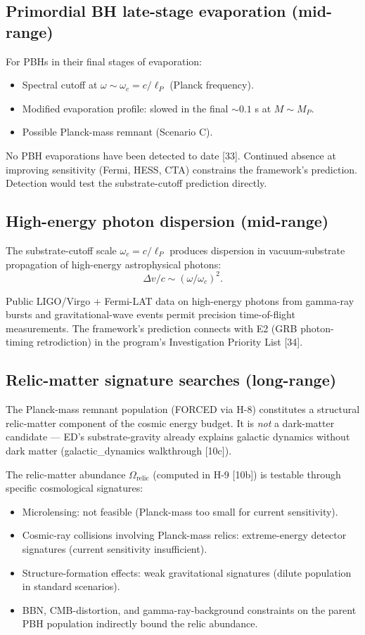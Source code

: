 \documentclass[11pt,a4paper]{article}
\begin{document}
\subsection{Primordial BH late-stage evaporation (mid-range)}

For PBHs in their final stages of evaporation:
\begin{itemize}[noitemsep]
  \item Spectral cutoff at $\omega \sim \omega_c = c/\ell_P$ (Planck frequency).
  \item Modified evaporation profile: slowed in the final $\sim 0.1$ s at $M \sim M_P$.
  \item Possible Planck-mass remnant (Scenario C).
\end{itemize}

No PBH evaporations have been detected to date [33]. Continued absence at improving sensitivity (Fermi, HESS, CTA) constrains the framework's prediction. Detection would test the substrate-cutoff prediction directly.

\subsection{High-energy photon dispersion (mid-range)}

The substrate-cutoff scale $\omega_c = c/\ell_P$ produces dispersion in vacuum-substrate propagation of high-energy astrophysical photons:
\[
\Delta v / c \sim (\omega/\omega_c)^2.
\]

Public LIGO/Virgo + Fermi-LAT data on high-energy photons from gamma-ray bursts and gravitational-wave events permit precision time-of-flight measurements. The framework's prediction connects with E2 (GRB photon-timing retrodiction) in the program's Investigation Priority List [34].

\subsection{Relic-matter signature searches (long-range)}

The Planck-mass remnant population (FORCED via H-8) constitutes a structural relic-matter component of the cosmic energy budget. It is \emph{not} a dark-matter candidate --- ED's substrate-gravity already explains galactic dynamics without dark matter (galactic\_dynamics walkthrough [10c]).

The relic-matter abundance $\Omega_{\mathrm{relic}}$ (computed in H-9 [10b]) is testable through specific cosmological signatures:
\begin{itemize}[noitemsep]
  \item Microlensing: not feasible (Planck-mass too small for current sensitivity).
  \item Cosmic-ray collisions involving Planck-mass relics: extreme-energy detector signatures (current sensitivity insufficient).
  \item Structure-formation effects: weak gravitational signatures (dilute population in standard scenarios).
  \item BBN, CMB-distortion, and gamma-ray-background constraints on the parent PBH population indirectly bound the relic abundance.
\end{itemize}
\end{document}
